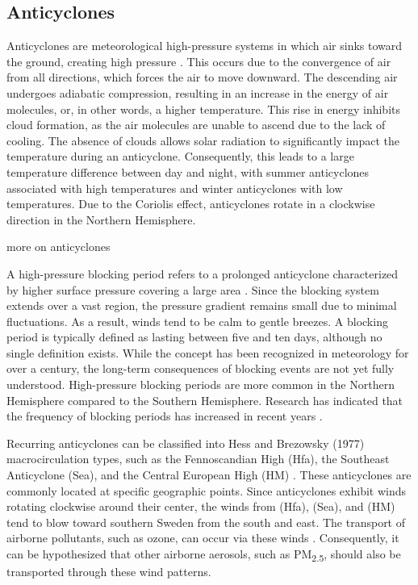 

\subsection{Anticyclones}
Anticyclones are meteorological high-pressure systems in which air sinks toward the ground, creating high pressure \cite{spiridonovCyclonesAnticyclonesSpringerLink2020}. This occurs due to the convergence of air from all directions, which forces the air to move downward. The descending air undergoes adiabatic compression, resulting in an increase in the energy of air molecules, or, in other words, a higher temperature. This rise in energy inhibits cloud formation, as the air molecules are unable to ascend due to the lack of cooling. The absence of clouds allows solar radiation to significantly impact the temperature during an anticyclone. Consequently, this leads to a large temperature difference between day and night, with summer anticyclones associated with high temperatures and winter anticyclones with low temperatures. Due to the Coriolis effect, anticyclones rotate in a clockwise direction in the Northern Hemisphere.

more on anticyclones

A high-pressure blocking period refers to a prolonged anticyclone characterized by higher surface pressure covering a large area \cite{lupoAtmosphericBlockingEvents2020}. Since the blocking system extends over a vast region, the pressure gradient remains small due to minimal fluctuations. As a result, winds tend to be calm to gentle breezes. A blocking period is typically defined as lasting between five and ten days, although no single definition exists. While the concept has been recognized in meteorology for over a century, the long-term consequences of blocking events are not yet fully understood. High-pressure blocking periods are more common in the Northern Hemisphere compared to the Southern Hemisphere. Research has indicated that the frequency of blocking periods has increased in recent years \cite{lupoAtmosphericBlockingEvents2020}. 

Recurring anticyclones can be classified into Hess and Brezowsky (1977) macrocirculation types, such as the Fennoscandian High (Hfa), the Southeast Anticyclone (Sea), and the Central European High (HM) \cite{bartholyEuropeanCycloneTrack2006}. These anticyclones are commonly located at specific geographic points. Since anticyclones exhibit winds rotating clockwise around their center, the winds from (Hfa), (Sea), and (HM) tend to blow toward southern Sweden from the south and east. The transport of airborne pollutants, such as ozone, can occur via these winds \cite{oteroImpactAtmosphericBlocking2022}. Consequently, it can be hypothesized that other airborne aerosols, such as PM\textsubscript{2.5}, should also be transported through these wind patterns.

